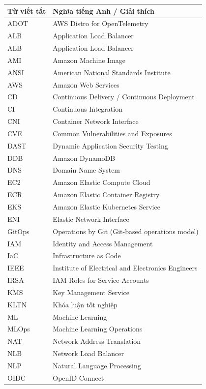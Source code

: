 \documentclass[13pt,a4paper,twoside]{extarticle}
\begin{document}
\begin{longtable}{@{}p{3.5cm} p{12cm}@{}}
\textbf{Từ viết tắt} & \textbf{Nghĩa tiếng Anh / Giải thích} \\ \midrule
ADOT   & AWS Distro for OpenTelemetry \\
ALB    & Application Load Balancer \\
ALB    & Application Load Balancer \\
AMI    & Amazon Machine Image \\
ANSI   & American National Standards Institute \\
AWS    & Amazon Web Services \\
CD     & Continuous Delivery / Continuous Deployment \\
CI     & Continuous Integration \\
CNI    & Container Network Interface \\
CVE    & Common Vulnerabilities and Exposures \\
DAST   & Dynamic Application Security Testing \\
DDB    & Amazon DynamoDB \\
DNS    & Domain Name System \\
EC2    & Amazon Elastic Compute Cloud \\
ECR    & Amazon Elastic Container Registry \\
EKS    & Amazon Elastic Kubernetes Service \\
ENI    & Elastic Network Interface \\
GitOps & Operations by Git (Git-based operations model) \\
IAM    & Identity and Access Management \\
IaC    & Infrastructure as Code \\
IEEE   & Institute of Electrical and Electronics Engineers \\
IRSA   & IAM Roles for Service Accounts \\
KMS    & Key Management Service \\
KLTN   & Khóa luận tốt nghiệp \\
ML     & Machine Learning \\
MLOps  & Machine Learning Operations \\
NAT    & Network Address Translation \\
NLB    & Network Load Balancer \\
NLP    & Natural Language Processing \\
OIDC   & OpenID Connect \\

\end{longtable}
\end{document}
